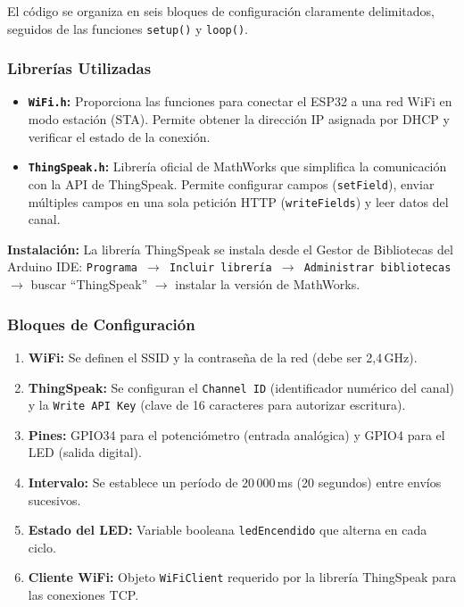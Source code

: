 \documentclass[12pt,a4paper]{article}
\begin{document}
El código se organiza en seis bloques de configuración claramente delimitados, seguidos de las funciones \texttt{setup()} y \texttt{loop()}.

\subsubsection*{Librerías Utilizadas}

\begin{itemize}
    \item \textbf{\texttt{WiFi.h}:} Proporciona las funciones para conectar el ESP32 a una red WiFi en modo estación (STA). Permite obtener la dirección IP asignada por DHCP y verificar el estado de la conexión.
    \item \textbf{\texttt{ThingSpeak.h}:} Librería oficial de MathWorks que simplifica la comunicación con la API de ThingSpeak. Permite configurar campos (\texttt{setField}), enviar múltiples campos en una sola petición HTTP (\texttt{writeFields}) y leer datos del canal.
\end{itemize}

\textbf{Instalación:} La librería ThingSpeak se instala desde el Gestor de Bibliotecas del Arduino IDE: \texttt{Programa $\rightarrow$ Incluir librería $\rightarrow$ Administrar bibliotecas $\rightarrow$} buscar ``ThingSpeak'' $\rightarrow$ instalar la versión de MathWorks.

\subsubsection*{Bloques de Configuración}

\begin{enumerate}
    \item \textbf{WiFi:} Se definen el SSID y la contraseña de la red (debe ser 2,4\,GHz).
    \item \textbf{ThingSpeak:} Se configuran el \texttt{Channel ID} (identificador numérico del canal) y la \texttt{Write API Key} (clave de 16 caracteres para autorizar escritura).
    \item \textbf{Pines:} GPIO34 para el potenciómetro (entrada analógica) y GPIO4 para el LED (salida digital).
    \item \textbf{Intervalo:} Se establece un período de 20\,000\,ms (20 segundos) entre envíos sucesivos.
    \item \textbf{Estado del LED:} Variable booleana \texttt{ledEncendido} que alterna en cada ciclo.
    \item \textbf{Cliente WiFi:} Objeto \texttt{WiFiClient} requerido por la librería ThingSpeak para las conexiones TCP.
\end{enumerate}
\end{document}
